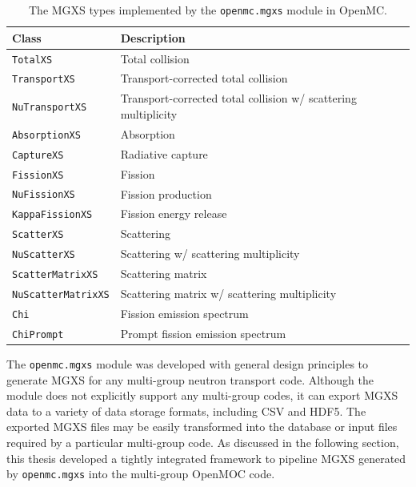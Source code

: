 \begin{table}[h!]
  \centering
  \caption[The MGXS types implemented for OpenMC]{The \ac{MGXS} types implemented by the \texttt{openmc.mgxs} module in OpenMC.}
  \small
  \label{table:chap4-mgxs-types} 
  \vspace{6pt}
  \begin{tabular}{l p{10cm}}
  \toprule
  \rowcolor{lightgray}
  {\bf Class} &
  {\bf Description} \\
  \midrule
  \texttt{TotalXS} & Total collision \\
  \texttt{TransportXS} & Transport-corrected total collision \\
  \texttt{NuTransportXS} & Transport-corrected total collision w/ scattering multiplicity \\
  \texttt{AbsorptionXS} & Absorption \\
  \texttt{CaptureXS} & Radiative capture \\
  \texttt{FissionXS} & Fission \\
  \texttt{NuFissionXS} & Fission production \\
  \texttt{KappaFissionXS} & Fission energy release \\
  \texttt{ScatterXS} & Scattering \\
  \texttt{NuScatterXS} & Scattering w/ scattering multiplicity \\
  \texttt{ScatterMatrixXS} & Scattering matrix \\
  \texttt{NuScatterMatrixXS} & Scattering matrix w/ scattering multiplicity \\
  \texttt{Chi} & Fission emission spectrum \\
  \texttt{ChiPrompt} & Prompt fission emission spectrum \\
  \bottomrule
\end{tabular}
\end{table}

The \texttt{openmc.mgxs} module was developed with general design principles to generate \ac{MGXS} for any multi-group neutron transport code. Although the module does not explicitly support any multi-group codes, it can export \ac{MGXS} data to a variety of data storage formats, including \ac{CSV} and \ac{HDF5}. The exported \ac{MGXS} files may be easily transformed into the database or input files required by a particular multi-group code. As discussed in the following section, this thesis developed a tightly integrated framework to pipeline \ac{MGXS} generated by \texttt{openmc.mgxs} into the multi-group OpenMOC code.


